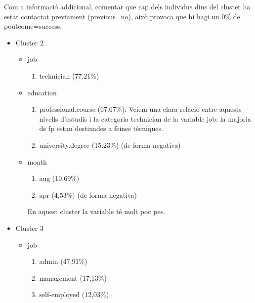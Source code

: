\documentclass[
]{article}
\providecommand{\tightlist}{%
  \setlength{\itemsep}{0pt}\setlength{\parskip}{0pt}}
\begin{document}
Com a informació addicional, comentar que cap dels individus dins del
cluster ha estat contactat previament (previous=no), això provoca que hi
hagi un 0\% de poutcome=success.

\begin{itemize}
\item
  Cluster 2

  \begin{itemize}
  \item
    job

    \begin{enumerate}
    \def\labelenumi{\arabic{enumi}.}
    \tightlist
    \item
      technician (77.21\%)
    \end{enumerate}
  \item
    education

    \begin{enumerate}
    \def\labelenumi{\arabic{enumi}.}
    \item
      professional.course (67.67\%): Veiem una clara relació entre
      aquests nivells d'estudis i la categoria technician de la variable
      job: la majoria de fp estan destinades a feines tècniques.
    \item
      university.degree (15.23\%) (de forma negativa)
    \end{enumerate}
  \item
    month

    \begin{enumerate}
    \def\labelenumi{\arabic{enumi}.}
    \item
      aug (10,69\%)
    \item
      apr (4,53\%) (de forma negativa)
    \end{enumerate}

    En aquest cluster la variable té molt poc pes.
  \end{itemize}
\item
  Cluster 3

  \begin{itemize}
  \item
    job

    \begin{enumerate}
    \def\labelenumi{\arabic{enumi}.}
    \item
      admin (47,91\%)
    \item
      management (17,13\%)
    \item
      self-employed (12,03\%)
    \end{enumerate}


\end{itemize}
\end{itemize}
\end{document}
